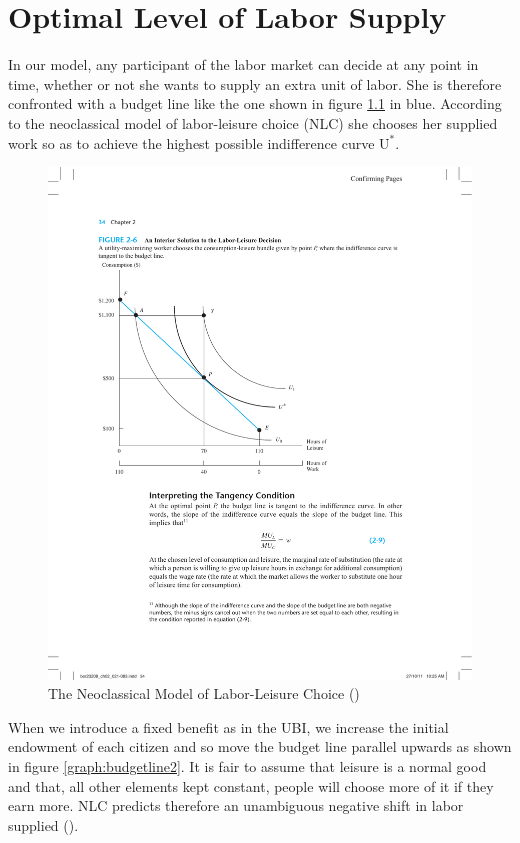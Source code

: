 \chapter{Optimal Level of Labor Supply}
\label{ch:optimum}
\thispagestyle{fancy}

In our model, any participant of the labor market can decide at any point in time, whether or not she wants to supply an extra unit of labor. She is therefore confronted with a budget line like the one shown in figure \ref{graph:budgetline} in blue. According to the neoclassical model of labor-leisure choice (NLC) she chooses her supplied work so as to achieve the highest possible indifference curve $\text{U}^*$.\\

\begin{figure}[ht!]
    \centering
    \includegraphics[scale = 0.60]{graphs/budget_line.pdf}
    \caption{The Neoclassical Model of Labor-Leisure Choice (\cite{borjas2012})}
    \label{graph:budgetline}
\end{figure}

When we introduce a fixed benefit as in the UBI, we increase the initial endowment of each citizen and so move the budget line parallel upwards as shown in figure \ref{graph:budgetline2}. It is fair to assume that leisure is a normal good and that, all other elements kept constant, people will choose more of it if they earn more. NLC predicts therefore an unambiguous negative shift in labor supplied (\cite{borjas2012}).\\

